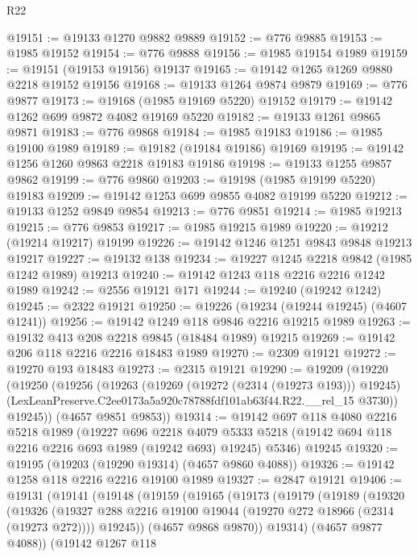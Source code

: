 \begin{lexlean}{R22}
\begin{coremodule}
@19151 := @19133 @1270 @9882 @9889
@19152 := @776 @9885
@19153 := @1985 @19152
@19154 := @776 @9888
@19156 := @1985 @19154 @1989
@19159 := @19151 (@19153 @19156) @19137
@19165 := @19142 @1265 @1269 @9880 @2218 @19152 @19156
@19168 := @19133 @1264 @9874 @9879
@19169 := @776 @9877
@19173 := @19168 (@1985 @19169 @5220) @19152
@19179 := @19142 @1262 @699 @9872 @4082 @19169 @5220
@19182 := @19133 @1261 @9865 @9871
@19183 := @776 @9868
@19184 := @1985 @19183
@19186 := @1985 @19100 @1989
@19189 := @19182 (@19184 @19186) @19169
@19195 := @19142 @1256 @1260 @9863 @2218 @19183 @19186
@19198 := @19133 @1255 @9857 @9862
@19199 := @776 @9860
@19203 := @19198 (@1985 @19199 @5220) @19183
@19209 := @19142 @1253 @699 @9855 @4082 @19199 @5220
@19212 := @19133 @1252 @9849 @9854
@19213 := @776 @9851
@19214 := @1985 @19213
@19215 := @776 @9853
@19217 := @1985 @19215 @1989
@19220 := @19212 (@19214 @19217) @19199
@19226 := @19142 @1246 @1251 @9843 @9848 @19213 @19217
@19227 := @19132 @138
@19234 := @19227 @1245 @2218 @9842 (@1985 @1242 @1989) @19213
@19240 := @19142 @1243 @118 @2216 @2216 @1242 @1989
@19242 := @2556 @19121 @171
@19244 := @19240 (@19242 @1242)
@19245 := @2322 @19121
@19250 := @19226 (@19234 (@19244 @19245) (@4607 @1241))
@19256 := @19142 @1249 @118 @9846 @2216 @19215 @1989
@19263 := @19132 @413 @208 @2218 @9845 (@18484 @1989) @19215
@19269 := @19142 @206 @118 @2216 @2216 @18483 @1989
@19270 := @2309 @19121
@19272 := @19270 @193 @18483
@19273 := @2315 @19121
@19290 := @19209
    (@19220
      (@19250
        (@19256
          (@19263
            (@19269 (@19272 (@2314 (@19273 @193))) @19245)
            (LexLeanPreserve.C2ee0173a5a920c78788fdf101ab63f44.R22.__rel_15 @3730))
          @19245))
      (@4657 @9851 @9853))
@19314 := @19142
    @697
    @118
    @4080
    @2216
    @5218
    @1989
    (@19227
      @696
      @2218
      @4079
      @5333
      @5218
      (@19142 @694 @118 @2216 @2216 @693 @1989 (@19242 @693) @19245)
      @5346)
    @19245
@19320 := @19195 (@19203 (@19290 @19314) (@4657 @9860 @4088))
@19326 := @19142 @1258 @118 @2216 @2216 @19100 @1989
@19327 := @2847 @19121
@19406 := @19131
    (@19141
      (@19148
        (@19159
          (@19165
            (@19173
              (@19179
                (@19189
                  (@19320
                    (@19326
                      (@19327 @288 @2216 @19100 @19044 (@19270 @272 @18966 (@2314 (@19273 @272))))
                      @19245))
                  (@4657 @9868 @9870))
                @19314)
              (@4657 @9877 @4088))
            (@19142
              @1267
              @118

\end{coremodule}
\end{lexlean}
